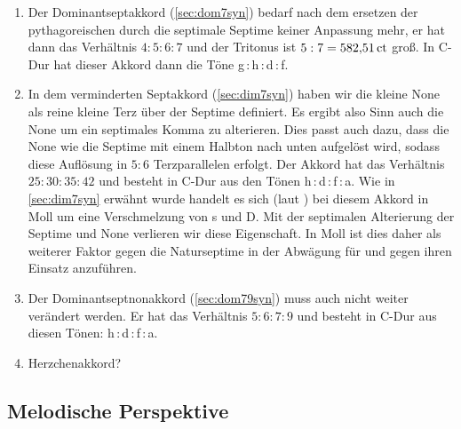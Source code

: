 \begin{enumerate}
  \item Der Dominantseptakkord (\cref{sec:dom7syn}) bedarf nach dem ersetzen der
  pythagoreischen durch die septimale Septime keiner Anpassung mehr, er hat dann
  das Verhältnis $4:5:6:7$ und der Tritonus ist $5:7 = 582{,}51\,\text{ct}$ groß. In
  C-Dur hat dieser Akkord dann die Töne g\,:\,\naturalm h\,:\,d\,:\,\septimal f.
  \item In dem verminderten Septakkord (\cref{sec:dim7syn}) haben wir die kleine
  None als reine kleine Terz über der Septime definiert. Es ergibt also Sinn
  auch die None um ein septimales Komma zu alterieren. Dies passt auch dazu,
  dass die None wie die Septime mit einem Halbton nach unten aufgelöst wird,
  sodass diese Auflösung in $5:6$ Terzparallelen erfolgt. Der Akkord hat das
  Verhältnis $25:30:35:42$ und besteht in C-Dur aus den Tönen
  \naturalm h\,:\,d\,:\,\septimal f\,:\,\septimal\flatp a. Wie in \cref{sec:dim7syn} erwähnt wurde handelt es sich (laut \cite[S.\,92ff.]{deLaMotte}) bei diesem Akkord in Moll um eine Verschmelzung von s und D. Mit der septimalen Alterierung der Septime und None verlieren wir diese Eigenschaft. In Moll ist dies daher als weiterer Faktor gegen die Naturseptime in der Abwägung für und gegen ihren Einsatz anzuführen.
  \item Der Dominantseptnonakkord (\cref{sec:dom79syn}) muss auch nicht weiter
  verändert werden. Er hat das Verhältnis $5:6:7:9$ und besteht in C-Dur aus
  diesen Tönen: \naturalm h\,:\,d\,:\,\septimal f\,:\,a.
  \item Herzchenakkord?
\end{enumerate}

\subsection{Melodische Perspektive}

